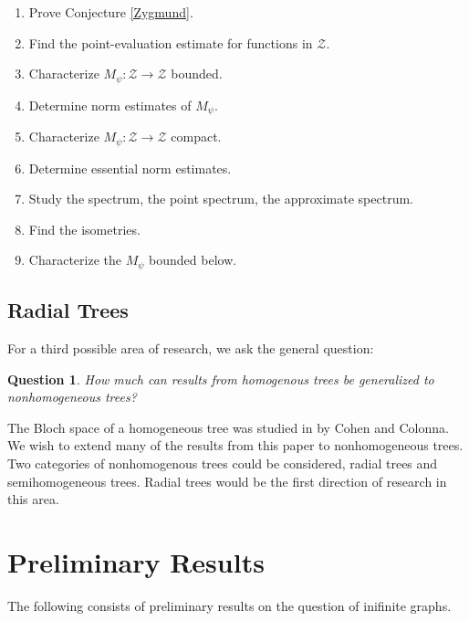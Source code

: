 \documentclass[11 pt]{report}
\newtheorem{question}[theorem]{Question}
\theoremstyle{definition}
\theoremstyle{definition}
\begin{document}
\begin{enumerate}
\item Prove Conjecture \ref{Zygmund}.

\item Find the point-evaluation estimate for functions in $\mathcal{Z}$.

\item Characterize $M_\psi : \mathcal{Z} \to \mathcal{Z}$ bounded.

\item Determine norm estimates of $M_\psi$.

\item Characterize $M_\psi : \mathcal{Z} \to \mathcal{Z}$ compact.

\item Determine essential norm estimates.

\item Study the spectrum, the point spectrum, the approximate spectrum. 

\item Find the isometries.

\item Characterize the $M_\psi$ bounded below. 

\end{enumerate}

\section{Radial Trees}

\indent \indent For a third possible area of research, we ask the general question: 
\begin{question} How much can results from homogenous trees be generalized to nonhomogeneous trees? \end{question}

\indent The Bloch space of a homogeneous tree was studied in \cite{HomoGen} by Cohen and Colonna. We wish to extend many of the results from this paper to nonhomogeneous trees. Two categories of nonhomogenous trees could be considered, radial trees and semihomogeneous trees. Radial trees would be the first direction of research in this area. 

\chapter{Preliminary Results}

\indent \indent The following consists of preliminary results on the question of inifinite graphs. 
\end{document}
